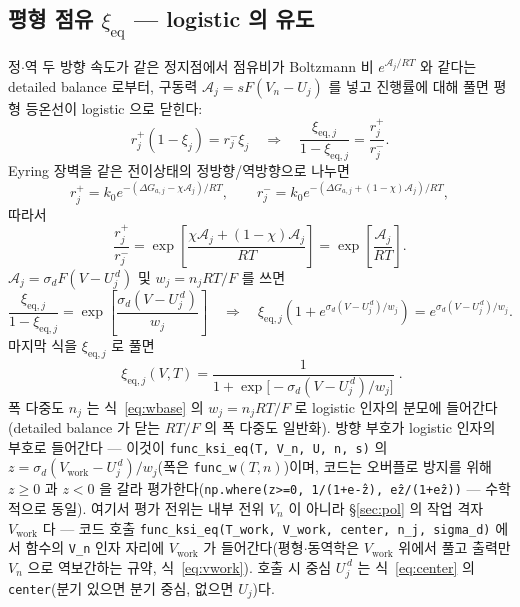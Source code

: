 \documentclass[11pt,a4paper]{article}
\newcommand{\eq}{\mathrm{eq}}
\newcommand{\work}{\mathrm{work}}
\newcommand{\code}[1]{\texttt{#1}}
\begin{document}
\subsection{평형 점유 $\xi_\eq$ — logistic 의 유도}
정$\cdot$역 두 방향 속도가 같은 정지점에서 점유비가 Boltzmann 비 $e^{\mathcal A_j/RT}$ 와 같다는 detailed balance 로부터,
구동력 $\mathcal A_j=sF(V_n-U_j)$ 를 넣고 진행률에 대해 풀면 평형 등온선이 logistic 으로 닫힌다:
\begin{equation}
r_j^+(1-\xi_j)=r_j^-\xi_j
\quad\Longrightarrow\quad
\frac{\xi_{\eq,j}}{1-\xi_{\eq,j}}=\frac{r_j^+}{r_j^-}.
\label{eq:xieqderiveA}
\end{equation}
Eyring 장벽을 같은 전이상태의 정방향/역방향으로 나누면
\begin{equation}
r_j^+=k_0e^{-(\Delta G_{a,j}-\chi\mathcal A_j)/RT},\qquad
r_j^-=k_0e^{-(\Delta G_{a,j}+(1-\chi)\mathcal A_j)/RT},
\label{eq:xieqderiveB}
\end{equation}
따라서
\begin{equation}
\frac{r_j^+}{r_j^-}
=\exp\!\left[\frac{\chi\mathcal A_j+(1-\chi)\mathcal A_j}{RT}\right]
=\exp\!\left[\frac{\mathcal A_j}{RT}\right].
\label{eq:xieqderiveC}
\end{equation}
$\mathcal A_j=\sigma_dF(V-U_j^{\,d})$ 및 $w_j=n_jRT/F$ 를 쓰면
\begin{equation}
\frac{\xi_{\eq,j}}{1-\xi_{\eq,j}}=\exp\!\left[\frac{\sigma_d(V-U_j^{\,d})}{w_j}\right]
\quad\Longrightarrow\quad
\xi_{\eq,j}\left(1+e^{\sigma_d(V-U_j^{\,d})/w_j}\right)
=e^{\sigma_d(V-U_j^{\,d})/w_j}.
\label{eq:xieqderiveD}
\end{equation}
마지막 식을 $\xi_{\eq,j}$ 로 풀면
\begin{equation}
\boxed{\;\xi_{\eq,j}(V,T)=\frac{1}{1+\exp\!\big[-\sigma_d(V-U_j^{\,d})/w_j\big]}\;.}
\label{eq:xieq}
\end{equation}
폭 다중도 $n_j$ 는 식~\eqref{eq:wbase} 의 $w_j=n_jRT/F$ 로 logistic 인자의 분모에 들어간다(detailed balance 가 닫는 $RT/F$ 의 폭 다중도 일반화). 방향 부호가 logistic 인자의 부호로 들어간다 — 이것이 \code{func\_ksi\_eq(T, V\_n, U, n, s)} 의
$z=\sigma_d(V_\work-U_j^{\,d})/w_j$(폭은 \code{func\_w}$(T,n)$)이며, 코드는 오버플로 방지를 위해 $z\ge0$ 과 $z<0$ 을
갈라 평가한다(\code{np.where(z>=0, 1/(1+e\^{-z}), e\^{z}/(1+e\^{z}))} — 수학적으로 동일). 여기서 평가 전위는
내부 전위 $V_n$ 이 아니라 \S\ref{sec:pol} 의 작업 격자 $V_\work$ 다 — 코드 호출 \code{func\_ksi\_eq(T\_work,
V\_work, center, n\_j, sigma\_d)} 에서 함수의 \code{V\_n} 인자 자리에 $V_\work$ 가 들어간다(평형$\cdot$동역학은
$V_\work$ 위에서 풀고 출력만 $V_n$ 으로 역보간하는 규약, 식~\eqref{eq:vwork}). 호출 시 중심 $U_j^{\,d}$ 는
식~\eqref{eq:center} 의 \code{center}(분기 있으면 분기 중심, 없으면 $U_j$)다.
\end{document}
